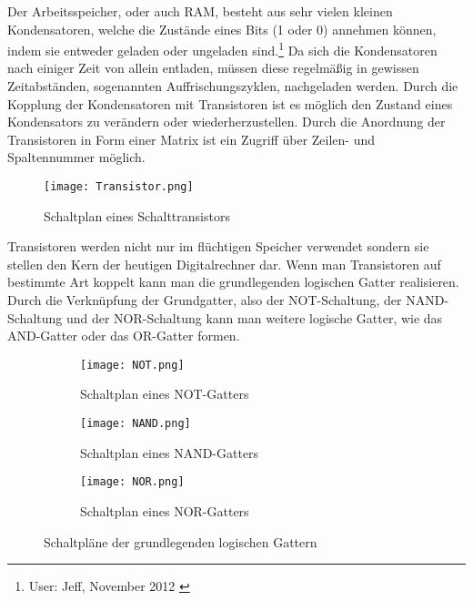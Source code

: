 \documentclass[12pt]{report}
\begin{document}
Der Arbeitsspeicher, oder auch RAM, besteht aus sehr vielen kleinen Kondensatoren, welche die Zustände eines Bits (1 oder 0) annehmen können, indem sie entweder geladen oder ungeladen sind.\footnote{User: Jeff, November 2012 \cite{j321-3}} Da sich die Kondensatoren nach einiger Zeit von allein entladen, müssen diese regelmäßig in gewissen Zeitabständen, sogenannten Auffrischungszyklen, nachgeladen werden. Durch die Kopplung der Kondensatoren mit Transistoren ist es möglich den Zustand eines Kondensators zu verändern oder wiederherzustellen. Durch die Anordnung der Transistoren in Form einer Matrix ist ein Zugriff über Zeilen- und Spaltennummer möglich.

\begin{figure}[h]
\centering
	\texttt{[image: Transistor.png]}
 	 \caption{
 	 Schaltplan eines Schalttransistors
 	 }
 	 
\end{figure}
Transistoren werden nicht nur im flüchtigen Speicher verwendet sondern sie stellen den Kern der heutigen Digitalrechner dar. Wenn man Transistoren auf bestimmte Art koppelt kann man die grundlegenden logischen Gatter realisieren. Durch die Verknüpfung der Grundgatter, also der NOT-Schaltung, der NAND-Schaltung und der NOR-Schaltung  kann man weitere logische Gatter, wie das AND-Gatter oder das OR-Gatter formen. 
\newpage
\begin{figure}[h]
\centering
\begin{subfigure}{.2\textwidth}

\centering
\texttt{[image: NOT.png]}
 	 \caption{
 	 Schaltplan eines NOT-Gatters
 	 }
 	 
 	
\end{subfigure}

\begin{subfigure}{.2\textwidth}
\centering
\texttt{[image: NAND.png]}
 	 \caption{
 	 Schaltplan eines NAND-Gatters
 	 }
\end{subfigure}

\begin{subfigure}{.2\textwidth}
\centering
\texttt{[image: NOR.png]}
 	 \caption{
 	 Schaltplan eines NOR-Gatters
 	 }
\end{subfigure}
\caption{Schaltpläne der grundlegenden logischen Gattern}

\end{figure}
 
\end{document}

